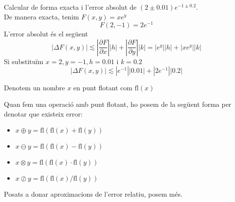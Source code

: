 \documentclass[../main.tex]{subfiles}
\begin{document}
    \begin{exercici}
        Calcular de forma exacta i l'error absolut de $(2\pm 0.01)e^{-1\pm 0.2}$.\\
        De manera exacta, tenim $F\left( x,y \right) = xe^y$
        \begin{displaymath}
            F(2, -1) = 2e^{-1}
        \end{displaymath}
        L'error absolut és el següent
        \begin{displaymath}
            \left\lvert \Delta F\left( x,y \right) \right\rvert \lesssim \left\lvert \frac{\partial F}{\partial x} \right\rvert\left\lvert h \right\rvert +  \left\lvert \frac{\partial F}{\partial y} \right\rvert\left\lvert k \right\rvert = \left\lvert e^y \right\rvert\left\lvert h \right\rvert + \left\lvert xe^y \right\rvert\left\lvert k \right\rvert
        \end{displaymath}
        Si substituïm $x = 2, y = -1, h = 0.01$ i $k = 0.2$
        \begin{displaymath}
            \left\lvert \Delta F\left( x,y \right) \right\rvert \lesssim \left\lvert e^{-1} \right\rvert\left\lvert 0.01 \right\rvert + \left\lvert 2e^{-1} \right\rvert\left\lvert 0.2 \right\rvert
        \end{displaymath}
    \end{exercici}
    \begin{notacio}
        Denotem un nombre $x$ en punt flotant com $\text{fl} \left(x\right)$
    \end{notacio}
    \begin{notacio}
        Quan fem una operació amb punt flotant, ho posem de la següent forma per denotar que
        existeix error:
        \begin{itemize}
            \item $x \oplus y = \text{fl}\left( \text{fl}\left( x \right) + \text{fl}\left( y \right)\right)$
            \item $x \ominus y = \text{fl}\left( \text{fl}\left( x \right) - \text{fl}\left( y \right)\right)$
            \item $x \otimes y = \text{fl}\left( \text{fl}\left( x \right) \cdot \text{fl}\left( y \right)\right)$
            \item $x \oslash y = \text{fl}\left( \text{fl}\left( x \right) / \text{fl}\left( y \right)\right)$
        \end{itemize}
    \end{notacio}
    \begin{obs}
        Posats a donar aproximacions de l'error relatiu, posem més.
    \end{obs}
\end{document}
